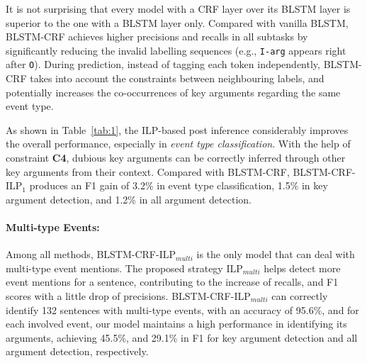 
It is not surprising that  every model with a CRF layer over its BLSTM layer is superior to the one with a BLSTM layer only. Compared with vanilla BLSTM, BLSTM-CRF achieves higher precisions and recalls in all subtasks by significantly reducing the invalid labelling sequences (e.g., \texttt{I-arg} appears right after \texttt{O}). During prediction, instead of tagging each token independently, BLSTM-CRF takes into account the constraints between neighbouring labels, and potentially increases the co-occurrences of key arguments regarding the same event type. %

As shown in Table~\ref{tab:1}, the ILP-based post inference considerably improves the overall performance, especially in \textit{event type classification}. With the help of constraint \textbf{C4},  dubious key arguments can be correctly inferred through other key arguments from their context. Compared with BLSTM-CRF, BLSTM-CRF-ILP$_1$ produces an F1 gain of 3.2\% in event type classification, 1.5\% in key argument detection, and 1.2\% in all argument detection. %

\paragraph{Multi-type Events:}
Among all methods, BLSTM-CRF-ILP$_{multi}$ is the only model that can deal with multi-type event mentions. %
The proposed strategy ILP$_{multi}$ helps detect more event mentions for a sentence, contributing to the increase of recalls, and F1 scores with a little drop of precisions.
BLSTM-CRF-ILP$_{multi}$ can correctly identify 132 sentences with multi-type events,
with an accuracy of 95.6\%, and for each involved event, our model maintains a high
performance in identifying its arguments, achieving 45.5\%, and 29.1\% in F1 for key argument detection and all argument detection, respectively.

